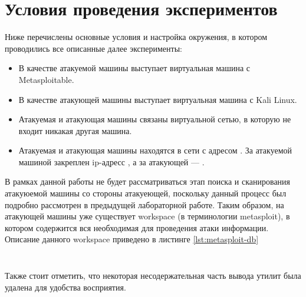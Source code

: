 \section{Условия проведения экспериментов}

Ниже перечислены основные условия и настройка окружения, в котором проводились все описанные далее эксперименты:
\begin{itemize}
    \item В качестве атакуемой машины выступает виртуальная машина с Metasploitable.
    \item В качестве атакующей машины выступает виртуальная машина с Kali Linux.
    \item Атакуемая и атакующая машины связаны виртуальной сетью, в которую не входит никакая другая машина.
    \item Атакуемая и атакующая машины находятся в сети с адресом . За атакуемой машиной закреплен ip-адресс
        , а за атакующей --- .
\end{itemize}
В рамках данной работы не будет рассматриваться этап поиска и сканирования атакуюемой машины со стороны атакуеющей, поскольку данный
процесс был подробно рассмотрен в предыдущей лабораторной работе. Таким образом, на атакующей машины уже существует workspace (в 
терминологии metasploit), в котором содержится вся необходимая для проведения атаки информации. Описание данного workspace приведено
в листинге \ref{lst:metasploit-db}

\inputminted[lastline=10]{console}{resources/environment/00_metasploit_db}
\inputminted[firstline=12]{console}{resources/environment/00_metasploit_db}


Также стоит отметить, что некоторая несодержательная часть вывода утилит была удалена для удобства восприятия.